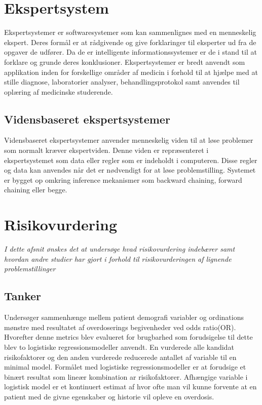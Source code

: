 \chapter{Ekspertsystem}
Ekspertsystemer er softwaresystemer som kan sammenlignes med en menneskelig ekspert. Deres formål er at rådgivende og give forklaringer til eksperter ud fra de opgaver de udfører. Da de er intelligente informationssystemer er de i stand til at forklare og grunde deres konklusioner. Ekspertsystemer er bredt anvendt som applikation inden for forskellige områder af medicin i forhold til at hjælpe med at stille diagnose, laboratorier analyser, behandlingsprotokol samt anvendes til oplæring af medicinske studerende. 

\section{Vidensbaseret ekspertsystemer}
Vidensbaseret ekspertsystemer anvender menneskelig viden til at løse problemer som normalt kræver ekspertviden. Denne viden er repræsenteret i ekspertsystemet som data eller regler som er indeholdt i computeren. Disse regler og data kan anvendes når det er nødvendigt for at løse problemstilling. Systemet er bygget op omkring inference mekanismer som backward chaining, forward chaining eller begge.  

\chapter{Risikovurdering}
\textit{I dette afsnit ønskes det at undersøge hvad risikovurdering indebærer samt hvordan andre studier har gjort i forhold til risikovurderingen af lignende problemstillinger}


\section{Tanker}
Undersøger sammenhænge mellem patient demografi variabler og ordinations mønstre med resultatet af overdoserings begivenheder ved odds ratio(OR). Hvorefter denne metrics blev evalueret for brugbarhed som forudsigelse til dette blev to logistiske regressionsmodeller anvendt. En vurderede alle kandidat risikofaktorer og den anden vurderede reducerede antallet af variable til en minimal model. Formålet med logistiske regressionsmodeller er at forudsige et binært resultat som lineær kombination ar risikofaktorer. Afhængige variable i logistisk model er et kontinuert estimat af hvor ofte man vil kunne forvente at en patient med de givne egenskaber og historie vil opleve en overdosis. 



